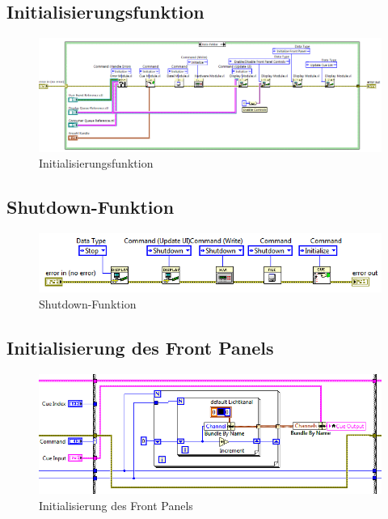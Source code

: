 \appendix
\renewcommand{\listtablename}{Anhang}
\renewcommand{\lstlistingname}{} 
\renewcommand{\thelstlisting}{Quellcode \arabic{lstlisting}}
\listoftables
{}

	\newpage	
	\subsection{Initialisierungsfunktion}
	\label{a1}
	\begin{figure}[h!]
	\centering
		\includegraphics[angle=90, height=0.8\textheight ]{Pics/init.png}
	\caption{Initialisierungsfunktion}
	\label{fig:a1}
	\end{figure}
	\newpage
	
	\subsection{Shutdown-Funktion}
	\begin{figure}[h!]
	\centering
		\includegraphics[width=\textwidth]{Pics/shutdown.png}
	\caption{Shutdown-Funktion}
	\label{fig:a2}
	\end{figure}
	


	\subsection{Initialisierung des Front Panels}
	\begin{figure}[h!]
	\centering
		\includegraphics[width=\textwidth]{Pics/init-front.png}
	\caption{Initialisierung des Front Panels}
	\label{fig:a3}
	\end{figure}
	


